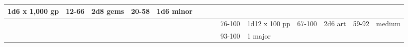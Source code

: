 \begin{longtable}{llllllllllllll}
{\begin{minipage}[t]{0.469in}
1d6 x 1,000 gp\end{minipage}} & \multicolumn{1}{p{0.923in}|}{\begin{minipage}[t]{0.923in}\raggedright
12-66\end{minipage}} & \multicolumn{1}{p{0.469in}|}{\begin{minipage}[t]{0.469in}\raggedright
2d8 gems\end{minipage}} & \multicolumn{1}{p{0.626in}|}{\begin{minipage}[t]{0.626in}\raggedright
20-58\end{minipage}} & \multicolumn{1}{p{0.469in}|}{\begin{minipage}[t]{0.469in}\centering
1d6 minor\end{minipage}}\\
\hline
\multicolumn{8}{p{1.150in}|}{\begin{minipage}[t]{1.150in}\centering
\end{minipage}} & \multicolumn{1}{|p{0.393in}|}{\begin{minipage}[t]{0.393in}\raggedright
76-100\end{minipage}} & \multicolumn{1}{p{0.469in}|}{\begin{minipage}[t]{0.469in}\raggedright
1d12 x 100 pp\end{minipage}} & \multicolumn{1}{p{0.923in}|}{\begin{minipage}[t]{0.923in}\raggedright
67-100\end{minipage}} & \multicolumn{1}{p{0.469in}|}{\begin{minipage}[t]{0.469in}\raggedright
2d6 art\end{minipage}} & \multicolumn{1}{p{0.626in}|}{\begin{minipage}[t]{0.626in}\raggedright
59-92\end{minipage}} & \multicolumn{1}{p{0.469in}|}{\begin{minipage}[t]{0.469in}\centering
1 medium\end{minipage}}\\
\hline
\multicolumn{8}{p{1.150in}|}{\begin{minipage}[t]{1.150in}\centering
\end{minipage}} & \multicolumn{1}{|p{0.393in}|}{\begin{minipage}[t]{0.393in}\raggedright
93-100\end{minipage}} & \multicolumn{1}{p{0.469in}|}{\begin{minipage}[t]{0.469in}\raggedright
1 major\end{minipage}} & \multicolumn{1}{p{0.923in}|}{\begin{minipage}[t]{0.923in}\raggedright

\end{minipage}}
\end{longtable}
